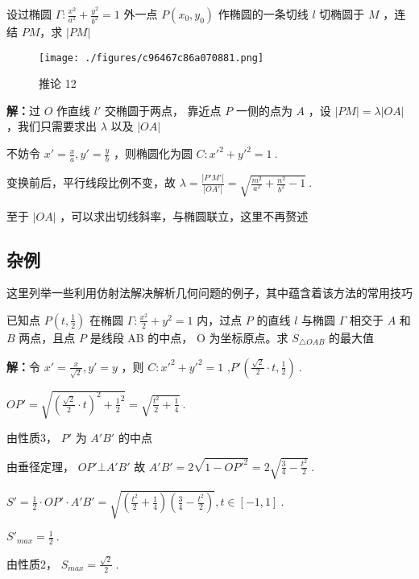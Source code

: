 \begin{corollary}{}
设过椭圆 $\displaystyle{\Gamma:\frac{x^2}{a^2}+\frac{y^2}{b^2}=1}$ 外一点 $\displaystyle{P(x_0,y_0)}$ 作椭圆的一条切线 $\displaystyle{l}$ 切椭圆于 $\displaystyle{M}$ ，连结 $\displaystyle{PM}$，求 $\displaystyle{|PM|}$
\begin{figure}[ht]
\centering
\texttt{[image: ./figures/c96467c86a070881.png]}
\caption{推论 12} \label{fig_affine_9}
\end{figure}
\textbf{解：}过 $\displaystyle{O}$ 作直线 $\displaystyle{l'}$ 交椭圆于两点， 靠近点 $\displaystyle{P}$ 一侧的点为 $\displaystyle{A}$ ，设 $\displaystyle{|PM|=\lambda|OA|}$ ，我们只需要求出 $\displaystyle{\lambda}$ 以及 $\displaystyle{|OA|}$ 

不妨令 $\displaystyle{x'=\frac{x}{a},y'=\frac{y}{b}}$ ，则椭圆化为圆 $\displaystyle{C:x'^2+y'^2=1}~.$

变换前后，平行线段比例不变，故 $\displaystyle{\lambda=\frac{|P'M'|}{|OA'|}=\sqrt{\frac{m^2}{a^2}+\frac{n^2}{b^2}-1}}~.$ 

至于 $\displaystyle{|OA|}$ ，可以求出切线斜率，与椭圆联立，这里不再赘述
\end{corollary}

\subsection{杂例}
这里列举一些利用仿射法解决解析几何问题的例子，其中蕴含着该方法的常用技巧
\begin{example}{}
已知点 $\displaystyle{P\left(t,\frac{1}{2}\right)}$ 在椭圆 $\displaystyle{\Gamma:\frac{x^2}{2}+y^2=1}$ 内，过点 $\displaystyle{P}$ 的直线 $\displaystyle{l}$ 与椭圆 $\displaystyle{\Gamma}$ 相交于 $\displaystyle{A}$ 和 $\displaystyle{B}$ 两点，且点 $\displaystyle{P}$ 是线段 AB 的中点， O 为坐标原点。求 $\displaystyle{S_{\triangle OAB}}$ 的最大值

\textbf{解：}令 $\displaystyle{x'=\frac{x}{\sqrt{2}},y'=y}$ ，则 $\displaystyle{C:x'^2+y'^2=1}$ ,$\displaystyle{P'\left(\frac{\sqrt{2}}{2}\cdot t,\frac{1}{2}\right)}~.$

$\displaystyle{OP'=\sqrt{\left(\frac{\sqrt{2}}{2}\cdot t\right)^2+{\frac{1}{2}}^2}=\sqrt{\frac{t^2}{2}+\frac{1}{4}}}~.$

由性质3， $\displaystyle{P'}$ 为 $\displaystyle{A'B'}$ 的中点

由垂径定理， $\displaystyle{OP'\bot A'B'}$ 
故 $\displaystyle{A'B'=2\sqrt{1-OP'^2}=2\sqrt{\frac{3}{4}-\frac{t^2}{2}}}~.$

$\displaystyle{S'=\frac{1}{2}\cdot OP' \cdot A'B'=\sqrt{\left(\frac{t^2}{2}+\frac{1}{4}\right)\left(\frac{3}{4}-\frac{t^2}{2}\right)},t\in[-1,1]}~.$

$\displaystyle{S'_{max}=\frac{1}{2}}~.$

由性质2， $\displaystyle{S_{max}=\frac{\sqrt{2}}{2}}~.$ 
\end{example}

